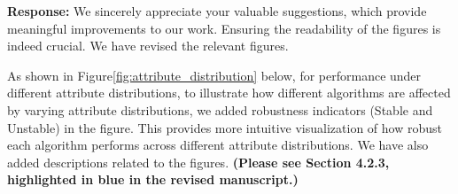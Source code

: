 \documentclass[sigconf, nonacm]{acmart}
\begin{document}
\noindent
\textbf{Response:} We sincerely appreciate your valuable suggestions, which provide meaningful improvements to our work. Ensuring the readability of the figures is indeed crucial. We have revised the relevant figures. 

As shown in Figure\ref{fig:attribute_distribution} below, for performance under different attribute distributions, to illustrate how different algorithms are affected by varying attribute distributions, we added robustness indicators (Stable and Unstable) in the figure. This provides more intuitive visualization of how robust each algorithm performs across different attribute distributions. We have also added descriptions related to the figures. \textbf{(Please see Section 4.2.3, highlighted in blue in the revised manuscript.)}
\end{document}
